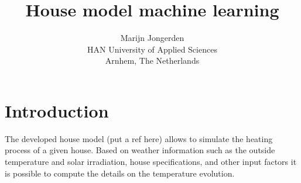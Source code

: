 

\title{House model machine learning}
\author{Marijn Jongerden\\
HAN University of Applied Sciences\\
Arnhem, The Netherlands}


	
\ldf  %


\ldf

\maketitle





\section{Introduction}\label{s:introduction}
The developed house model (put a ref here) allows to simulate the heating process of a given house. Based on weather information such as the outside temperature and solar irradiation, house specifications, and other input factors it is possible to compute the details on the temperature evolution. 


